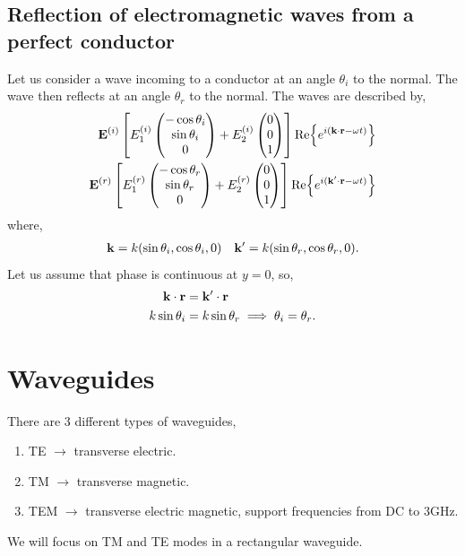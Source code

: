 \documentclass{book}
\begin{document}
\subsection{Reflection of electromagnetic waves from a perfect conductor}
Let us consider a wave incoming to a conductor at an angle $\theta_i$ to the normal. The wave then reflects at an angle $\theta_r$ to the normal. The waves are described by,
\begin{align}
	\vb{E}^{(i)}\left[E_1^{(i)} \begin{pmatrix}
		-\cos\theta_i \\ \sin\theta_i \\ 0
	\end{pmatrix} + E_2^{(i)}\begin{pmatrix}
	0 \\ 0 \\ 1
	\end{pmatrix}\right]\Re{e^{i(\vb{k}\cdot\vb{r} - \omega t)}} \\ \vb{E}^{(r)}\left[E_1^{(r)} \begin{pmatrix}
	-\cos\theta_r \\ \sin\theta_r \\ 0
	\end{pmatrix} + E_2^{(r)}\begin{pmatrix}
	0 \\ 0 \\ 1
	\end{pmatrix}\right]\Re{e^{i(\vb{k}'\cdot\vb{r} - \omega t)}}
\end{align}
where,
\begin{align}
	\vb{k} = k(\sin\theta_i, \cos\theta_i, 0) && \vb{k}' = k(\sin\theta_r, \cos\theta_r, 0).
\end{align}
Let us assume that phase is continuous at $y = 0$, so,
\begin{equation}
	\begin{split}
		\vb{k}\cdot\vb{r} & = \vb{k}'\cdot\vb{r} \\
		k\sin\theta_i & = k\sin\theta_r \implies \theta_i = \theta_r.
	\end{split}
\end{equation}
\section{Waveguides}
There are 3 different types of waveguides,
\begin{enumerate}
	\item TE $\to$ transverse electric.
	\item TM $\to$ transverse magnetic.
	\item TEM $\to$ transverse electric magnetic, support frequencies from DC to 3GHz.
\end{enumerate}
We will focus on TM and TE modes in a rectangular waveguide.
\end{document}
